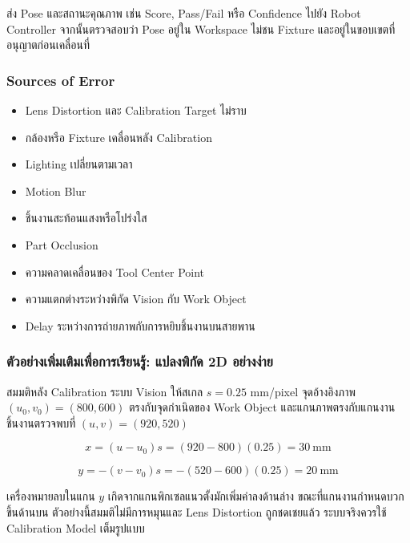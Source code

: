 ส่ง Pose และสถานะคุณภาพ เช่น Score, Pass/Fail หรือ Confidence ไปยัง Robot Controller จากนั้นตรวจสอบว่า Pose อยู่ใน Workspace ไม่ชน Fixture และอยู่ในขอบเขตที่อนุญาตก่อนเคลื่อนที่

\subsubsection{Sources of Error}

\begin{itemize}
    \item Lens Distortion และ Calibration Target ไม่ราบ
    \item กล้องหรือ Fixture เคลื่อนหลัง Calibration
    \item Lighting เปลี่ยนตามเวลา
    \item Motion Blur
    \item ชิ้นงานสะท้อนแสงหรือโปร่งใส
    \item Part Occlusion
    \item ความคลาดเคลื่อนของ Tool Center Point
    \item ความแตกต่างระหว่างพิกัด Vision กับ Work Object
    \item Delay ระหว่างการถ่ายภาพกับการหยิบชิ้นงานบนสายพาน
\end{itemize}

\subsubsection{ตัวอย่างเพิ่มเติมเพื่อการเรียนรู้: แปลงพิกัด 2D อย่างง่าย}

สมมติหลัง Calibration ระบบ Vision ให้สเกล $s=0.25$ mm/pixel จุดอ้างอิงภาพ $(u_0,v_0)=(800,600)$ ตรงกับจุดกำเนิดของ Work Object และแกนภาพตรงกับแกนงาน ชิ้นงานตรวจพบที่ $(u,v)=(920,520)$

\[
x=(u-u_0)s=(920-800)(0.25)=30\ \text{mm}
\]

\[
y=-(v-v_0)s=-(520-600)(0.25)=20\ \text{mm}
\]

เครื่องหมายลบในแกน $y$ เกิดจากแกนพิกเซลแนวตั้งมักเพิ่มค่าลงด้านล่าง ขณะที่แกนงานกำหนดบวกขึ้นด้านบน ตัวอย่างนี้สมมติไม่มีการหมุนและ Lens Distortion ถูกชดเชยแล้ว ระบบจริงควรใช้ Calibration Model เต็มรูปแบบ

